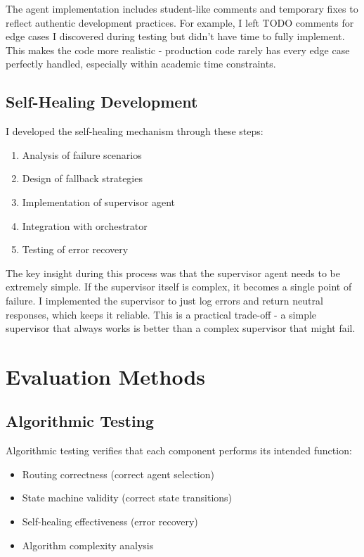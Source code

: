 The agent implementation includes student-like comments and temporary fixes to reflect authentic development practices. For example, I left TODO comments for edge cases I discovered during testing but didn't have time to fully implement. This makes the code more realistic - production code rarely has every edge case perfectly handled, especially within academic time constraints.

\subsection{Self-Healing Development}

I developed the self-healing mechanism through these steps:

\begin{enumerate}
    \item Analysis of failure scenarios
    \item Design of fallback strategies
    \item Implementation of supervisor agent
    \item Integration with orchestrator
    \item Testing of error recovery
\end{enumerate}

The key insight during this process was that the supervisor agent needs to be extremely simple. If the supervisor itself is complex, it becomes a single point of failure. I implemented the supervisor to just log errors and return neutral responses, which keeps it reliable. This is a practical trade-off - a simple supervisor that always works is better than a complex supervisor that might fail.

\section{Evaluation Methods}

\subsection{Algorithmic Testing}

Algorithmic testing verifies that each component performs its intended function:

\begin{itemize}
    \item Routing correctness (correct agent selection)
    \item State machine validity (correct state transitions)
    \item Self-healing effectiveness (error recovery)
    \item Algorithm complexity analysis
\end{itemize}

